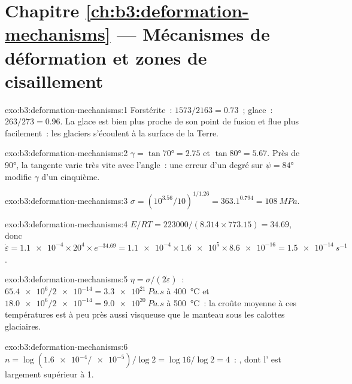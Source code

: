 \section*{Chapitre \ref{ch:b3:deformation-mechanisms} --- Mécanismes de déformation et zones de cisaillement}

\begin{solution}{exo:b3:deformation-mechanisms:1}
Forstérite~: $1573/2163 = 0.73$~; glace~: $263/273 = 0.96$. La glace est bien plus proche
de son point de fusion et flue plus facilement~: les glaciers
s'écoulent à la surface de la Terre.
\end{solution}

\begin{solution}{exo:b3:deformation-mechanisms:2}
$\gamma = \tan\ang{70} = 2.75$ et $\tan\ang{80} = 5.67$. Près de \ang{90}, la
tangente varie très vite avec l'angle~: une erreur d'un degré sur $\psi =
\ang{84}$ modifie $\gamma$ d'un cinquième.
\end{solution}

\begin{solution}{exo:b3:deformation-mechanisms:3}
$\sigma = (10^{3.56}/10)^{1/1.26} = 363.1^{0.794} = \qty{108}{MPa}$.
\end{solution}

\begin{solution}{exo:b3:deformation-mechanisms:4}
$E/RT = 223000/(8.314\times773.15) = 34.69$, donc $\dot\varepsilon =
\num{1.1e-4}\times20^4\times e^{-34.69} = \num{1.1e-4}\times\num{1.6e5}\times
\num{8.6e-16} = \qty{1.5e-14}{s^{-1}}$.
\end{solution}

\begin{solution}{exo:b3:deformation-mechanisms:5}
$\eta = \sigma/(2\dot\varepsilon)$~: $\num{65.4e6}/\num{2e-14} =
\qty{3.3e21}{Pa.s}$ à \qty{400}{\celsius} et $\num{18.0e6}/\num{2e-14} =
\qty{9.0e20}{Pa.s}$ à \qty{500}{\celsius}~: la croûte moyenne à ces
températures est à peu près aussi visqueuse que le manteau sous les calottes glaciaires.
\end{solution}

\begin{solution}{exo:b3:deformation-mechanisms:6}
$n = \log(\num{1.6e-4}/\num{e-5})/\log2 = \log16/\log2 = 4$~: ,
dont l' est largement supérieur à 1.
\end{solution}

